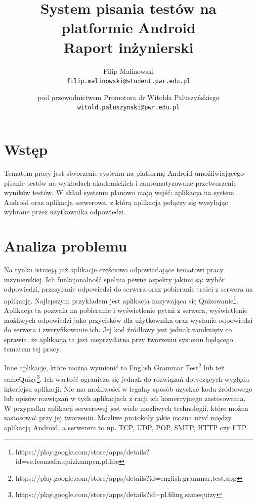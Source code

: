 \documentclass{report}
\title{%
	System pisania testów na platformie Android \\
	\large Raport inżynierski}
\author{
	Filip Malinowski\\
	\texttt{filip.malinowski@student.pwr.edu.pl}
	\and
	pod przewodnictwem Promotora dr Witolda Paluszyńskiego\\
	\texttt{witold.paluszynski@pwr.edu.pl}
}
\date{}
\begin{document}


	\chapter{Wstęp}

	Tematem pracy jest stworzenie systemu na platformę Android umożliwiającego pisanie testów na wykładach akademickich i zautomatyzowane przetworzenie wyników testów. W skład systemu planowo mają wejść: aplikacja na system Android oraz aplikacja serwerowa, z którą aplikacja połączy się wysyłając wybrane przez użytkownika odpowiedzi.\\
	
	\chapter{Analiza problemu}
	
	Na rynku istnieją już aplikacje częściowo odpowiadające tematowi pracy inżynierskiej. Ich funkcjonalność spełnia pewne aspekty jakimi są: wybór odpowiedzi, przesyłanie odpowiedzi do serwera oraz pobieranie treści z serwera na aplikację. Najlepszym przykładem jest aplikacja nazywająca się Quizowanie\footnote{https://play.google.com/store/apps/details?id=se.feomedia.quizkampen.pl.lite}. Aplikacja ta pozwala na pobieranie i wyświetlenie pytań z serwera, wyświetlenie możliwych odpowiedzi jako przycisków dla użytkownika oraz wysłanie odpowiedzi do serwera i zweryfikowanie ich. Jej kod źródłowy jest jednak zamknięty co sprawia, że aplikacja ta jest nieprzydatna  przy tworzeniu systemu będącego tematem tej pracy.
	
	Inne aplikacje, które można wymienić to English Grammar Test\footnote{https://play.google.com/store/apps/details?id=english.grammar.test.app} lub też sameQuizy\footnote{https://play.google.com/store/apps/details?id=pl.filing.samequizy}. Ich wartość ogranicza się jednak do rozwiązań dotyczących wyglądu interfejsu aplikacji. Nie ma możliwości w legalny sposób uzyskać kodu źródłowego lub opisów rozwiązań w tych aplikacjach z racji ich komercyjnego zastosowania.
	\\
	W przypadku aplikacji serwerowej jest wiele możliwych technologii, które można zastosować przy jej tworzeniu. Możliwe protokoły jakie można użyć między aplikacją Android, a serwerem to np. TCP, UDP, POP, SMTP, HTTP czy FTP.
	
\end{document}
